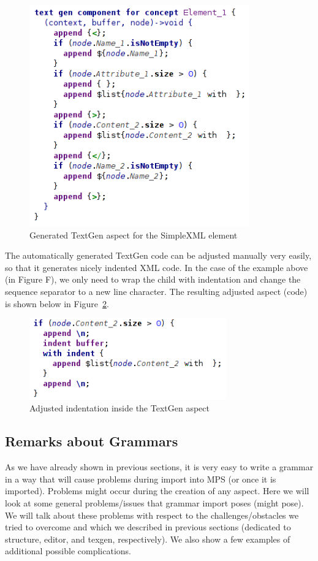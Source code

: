\begin{figure}[ht]
	\centering
	\includegraphics[width=95mm]{./images/textgen_final.png}
	\caption{Generated TextGen aspect for the SimpleXML element}
	\label{fig:textgen_final}
\end{figure}

The automatically generated TextGen code can be adjusted manually very easily, so that it generates nicely indented XML code.
In the case of the example above (in Figure F), we only need to wrap the  child with indentation and change the sequence separator to a new line character.
The resulting adjusted aspect (code) is shown below in Figure~\ref{fig:textgen_adjusted}.

\begin{figure}[t!]
	\centering
	\includegraphics[width=85mm]{./images/textgen_adjusted.png}
	\caption{Adjusted indentation inside the TextGen aspect}
	\label{fig:textgen_adjusted}
\end{figure}

\subsection{Remarks about Grammars}

As we have already shown in previous sections, it is very easy to write a grammar in a way that will cause problems during import into MPS (or once it is imported).
Problems might occur during the creation of any aspect.
Here we will look at some general problems/issues that grammar import poses (might pose).
We will talk about these problems with respect to the challenges/obstacles we tried to overcome and which we described in previous sections (dedicated to structure, editor, and texgen, respectively).
We also show a few examples of additional possible complications.

